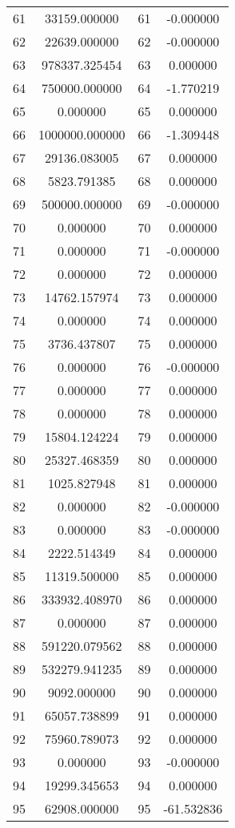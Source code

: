 \documentclass[12pt]{article}
\begin{document}
\begin{longtable}{@{}cccc@{}}
61 & 33159.000000 & 61 & -0.000000 \\
62 & 22639.000000 & 62 & -0.000000 \\
63 & 978337.325454 & 63 & 0.000000 \\
64 & 750000.000000 & 64 & -1.770219 \\
65 & 0.000000 & 65 & 0.000000 \\
66 & 1000000.000000 & 66 & -1.309448 \\
67 & 29136.083005 & 67 & 0.000000 \\
68 & 5823.791385 & 68 & 0.000000 \\
69 & 500000.000000 & 69 & -0.000000 \\
70 & 0.000000 & 70 & 0.000000 \\
71 & 0.000000 & 71 & -0.000000 \\
72 & 0.000000 & 72 & 0.000000 \\
73 & 14762.157974 & 73 & 0.000000 \\
74 & 0.000000 & 74 & 0.000000 \\
75 & 3736.437807 & 75 & 0.000000 \\
76 & 0.000000 & 76 & -0.000000 \\
77 & 0.000000 & 77 & 0.000000 \\
78 & 0.000000 & 78 & 0.000000 \\
79 & 15804.124224 & 79 & 0.000000 \\
80 & 25327.468359 & 80 & 0.000000 \\
81 & 1025.827948 & 81 & 0.000000 \\
82 & 0.000000 & 82 & -0.000000 \\
83 & 0.000000 & 83 & -0.000000 \\
84 & 2222.514349 & 84 & 0.000000 \\
85 & 11319.500000 & 85 & 0.000000 \\
86 & 333932.408970 & 86 & 0.000000 \\
87 & 0.000000 & 87 & 0.000000 \\
88 & 591220.079562 & 88 & 0.000000 \\
89 & 532279.941235 & 89 & 0.000000 \\
90 & 9092.000000 & 90 & 0.000000 \\
91 & 65057.738899 & 91 & 0.000000 \\
92 & 75960.789073 & 92 & 0.000000 \\
93 & 0.000000 & 93 & -0.000000 \\
94 & 19299.345653 & 94 & 0.000000 \\
95 & 62908.000000 & 95 & -61.532836 \\

\end{longtable}
\end{document}
